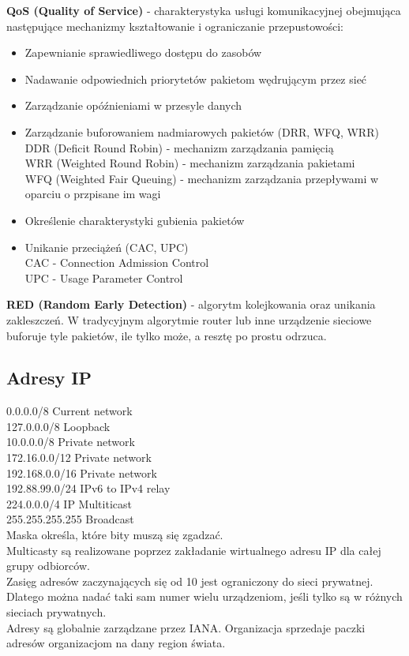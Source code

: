 \documentclass[]{article}
\begin{document}
\noindent
\textbf{QoS (Quality of Service)} - charakterystyka usługi komunikacyjnej obejmująca następujące mechanizmy
kształtowanie i ograniczanie przepustowości:
\begin{itemize}
    \item Zapewnianie sprawiedliwego dostępu do zasobów
    \item Nadawanie odpowiednich priorytetów pakietom wędrującym przez sieć
    \item Zarządzanie opóźnieniami w przesyle danych
    \item Zarządzanie buforowaniem nadmiarowych pakietów (DRR, WFQ, WRR) \\
    DDR (Deficit Round Robin) - mechanizm zarządzania pamięcią \\
    WRR (Weighted Round Robin) - mechanizm zarządzania pakietami \\
    WFQ (Weighted Fair Queuing) - mechanizm zarządzania przepływami w oparciu o przpisane im wagi
    \item Określenie charakterystyki gubienia pakietów
    \item Unikanie przeciążeń (CAC, UPC) \\
    CAC - Connection Admission Control \\
    UPC - Usage Parameter Control \\
\end{itemize}
\textbf{RED (Random Early Detection)} - algorytm kolejkowania oraz unikania zakleszczeń. W tradycyjnym algorytmie router lub inne urządzenie sieciowe buforuje tyle pakietów, ile tylko może, a resztę po prostu odrzuca.

\subsection{Adresy IP}
0.0.0.0/8 Current network \\
127.0.0.0/8 Loopback \\
10.0.0.0/8 Private network \\
172.16.0.0/12 Private network \\
192.168.0.0/16 Private network \\
192.88.99.0/24 IPv6 to IPv4 relay \\
224.0.0.0/4 IP Multiticast \\
255.255.255.255 Broadcast \\

\noindent
Maska określa, które bity muszą się zgadzać. \\
Multicasty są realizowane poprzez zakładanie wirtualnego adresu IP dla całej grupy odbiorców. \\
Zasięg adresów zaczynających się od 10 jest ograniczony do sieci prywatnej. Dlatego można nadać taki sam numer wielu urządzeniom, jeśli tylko są w różnych sieciach prywatnych. \\
Adresy są globalnie zarządzane przez IANA. Organizacja sprzedaje paczki adresów organizacjom na dany region świata. \\
\end{document}
